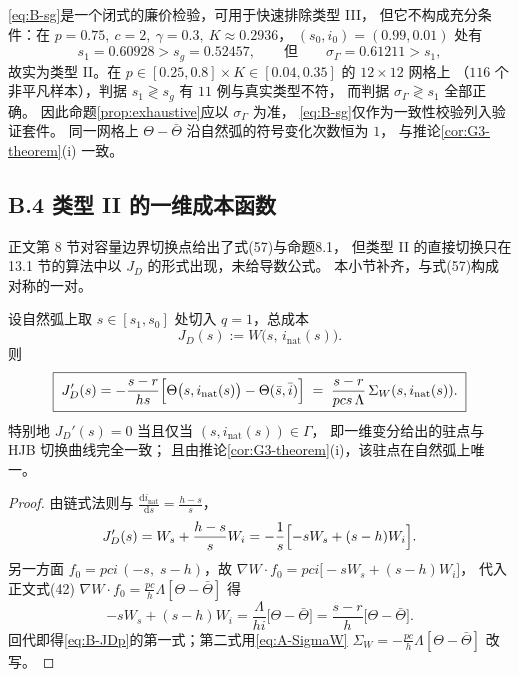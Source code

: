 \begin{remark}
\label{rem:sg-not-sufficient}
\eqref{eq:B-sg}是一个闭式的廉价检验，可用于快速排除类型 III，
但它不构成充分条件：在 $p=0.75,\ c=2,\ \gamma=0.3,\ K\approx0.2936$，
$(s_0,i_0)=(0.99,0.01)$ 处有
\[
  s_1=0.60928>s_g=0.52457,
  \qquad\text{但}\qquad
  \sigma_\Gamma=0.61211>s_1 ,
\]
故实为类型 II。在 $p\in[0.25,0.8]\times K\in[0.04,0.35]$ 的 $12\times12$ 网格上
（$116$ 个非平凡样本），判据 $s_1\gtrless s_g$ 有 $11$ 例与真实类型不符，
而判据 $\sigma_\Gamma\gtrless s_1$ 全部正确。
因此命题\ref{prop:exhaustive}应以 $\sigma_\Gamma$ 为准，
\eqref{eq:B-sg}仅作为一致性校验列入验证套件。
同一网格上 $\Theta-\bar\Theta$ 沿自然弧的符号变化次数恒为 $1$，
与推论\ref{cor:G3-theorem}(i) 一致。
\end{remark}


\subsection*{B.4 类型 II 的一维成本函数}

正文第 8 节对容量边界切换点给出了式(57)与命题8.1，
但类型 II 的直接切换只在 13.1 节的算法中以 $J_D$ 的形式出现，未给导数公式。
本小节补齐，与式(57)构成对称的一对。

\begin{proposition}[直接切换成本的导数]
\label{prop:JD-derivative}
设自然弧上取 $s\in[s_1,s_0]$ 处切入 $q=1$，总成本
\begin{equation}
  J_D(s):=W\bigl(s,\,i_{\mathrm{nat}}(s)\bigr).
  \label{eq:B-JD}
\end{equation}
则
\begin{equation}
  \boxed{\;J_D'(s)=-\frac{s-r}{hs}\Bigl[\Theta\bigl(s,i_{\mathrm{nat}}(s)\bigr)-\Theta(\bar s,\bar i)\Bigr]
  \;=\;\frac{s-r}{pcs\,\Lambda}\,\Sigma_W(s,i_{\mathrm{nat}}(s)) . \;}
  \label{eq:B-JDp}
\end{equation}
特别地 $J_D'(s)=0$ 当且仅当 $(s,i_{\mathrm{nat}}(s))\in\Gamma$，
即一维变分给出的驻点与 HJB 切换曲线完全一致；
且由推论\ref{cor:G3-theorem}(i)，该驻点在自然弧上唯一。
\end{proposition}

\begin{proof}
由链式法则与 $\frac{\mathrm{d}i_{\mathrm{nat}}}{\mathrm{d}s}=\frac{h-s}{s}$，
\[
  J_D'(s)=W_s+\frac{h-s}{s}W_i
  =-\frac{1}{s}\Bigl[-sW_s+(s-h)W_i\Bigr].
\]
另一方面 $f_0=pci\,(-s,\;s-h)$，故
$\nabla W\cdot f_0=pci\bigl[-sW_s+(s-h)W_i\bigr]$，
代入正文式(42) $\nabla W\cdot f_0=\frac{pc}{h}\Lambda[\Theta-\bar\Theta]$ 得
\[
  -sW_s+(s-h)W_i=\frac{\Lambda}{hi}\bigl[\Theta-\bar\Theta\bigr]
  =\frac{s-r}{h}\bigl[\Theta-\bar\Theta\bigr].
\]
回代即得\eqref{eq:B-JDp}的第一式；第二式用\eqref{eq:A-SigmaW}
$\Sigma_W=-\frac{pc}{h}\Lambda[\Theta-\bar\Theta]$ 改写。
\end{proof}

